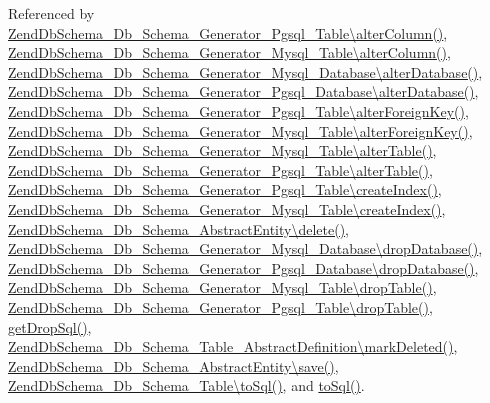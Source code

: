 Referenced by \hyperlink{Generator_2Pgsql_2Table_8php_source_l00174}{Zend\-Db\-Schema\-\_\-\-Db\-\_\-\-Schema\-\_\-\-Generator\-\_\-\-Pgsql\-\_\-\-Table\textbackslash{}alter\-Column()}, \hyperlink{Generator_2Mysql_2Table_8php_source_l00182}{Zend\-Db\-Schema\-\_\-\-Db\-\_\-\-Schema\-\_\-\-Generator\-\_\-\-Mysql\-\_\-\-Table\textbackslash{}alter\-Column()}, \hyperlink{Generator_2Mysql_2Database_8php_source_l00064}{Zend\-Db\-Schema\-\_\-\-Db\-\_\-\-Schema\-\_\-\-Generator\-\_\-\-Mysql\-\_\-\-Database\textbackslash{}alter\-Database()}, \hyperlink{Generator_2Pgsql_2Database_8php_source_l00075}{Zend\-Db\-Schema\-\_\-\-Db\-\_\-\-Schema\-\_\-\-Generator\-\_\-\-Pgsql\-\_\-\-Database\textbackslash{}alter\-Database()}, \hyperlink{Generator_2Pgsql_2Table_8php_source_l00335}{Zend\-Db\-Schema\-\_\-\-Db\-\_\-\-Schema\-\_\-\-Generator\-\_\-\-Pgsql\-\_\-\-Table\textbackslash{}alter\-Foreign\-Key()}, \hyperlink{Generator_2Mysql_2Table_8php_source_l00358}{Zend\-Db\-Schema\-\_\-\-Db\-\_\-\-Schema\-\_\-\-Generator\-\_\-\-Mysql\-\_\-\-Table\textbackslash{}alter\-Foreign\-Key()}, \hyperlink{Generator_2Mysql_2Table_8php_source_l00074}{Zend\-Db\-Schema\-\_\-\-Db\-\_\-\-Schema\-\_\-\-Generator\-\_\-\-Mysql\-\_\-\-Table\textbackslash{}alter\-Table()}, \hyperlink{Generator_2Pgsql_2Table_8php_source_l00083}{Zend\-Db\-Schema\-\_\-\-Db\-\_\-\-Schema\-\_\-\-Generator\-\_\-\-Pgsql\-\_\-\-Table\textbackslash{}alter\-Table()}, \hyperlink{Generator_2Pgsql_2Table_8php_source_l00219}{Zend\-Db\-Schema\-\_\-\-Db\-\_\-\-Schema\-\_\-\-Generator\-\_\-\-Pgsql\-\_\-\-Table\textbackslash{}create\-Index()}, \hyperlink{Generator_2Mysql_2Table_8php_source_l00227}{Zend\-Db\-Schema\-\_\-\-Db\-\_\-\-Schema\-\_\-\-Generator\-\_\-\-Mysql\-\_\-\-Table\textbackslash{}create\-Index()}, \hyperlink{AbstractEntity_8php_source_l00192}{Zend\-Db\-Schema\-\_\-\-Db\-\_\-\-Schema\-\_\-\-Abstract\-Entity\textbackslash{}delete()}, \hyperlink{Generator_2Mysql_2Database_8php_source_l00092}{Zend\-Db\-Schema\-\_\-\-Db\-\_\-\-Schema\-\_\-\-Generator\-\_\-\-Mysql\-\_\-\-Database\textbackslash{}drop\-Database()}, \hyperlink{Generator_2Pgsql_2Database_8php_source_l00110}{Zend\-Db\-Schema\-\_\-\-Db\-\_\-\-Schema\-\_\-\-Generator\-\_\-\-Pgsql\-\_\-\-Database\textbackslash{}drop\-Database()}, \hyperlink{Generator_2Mysql_2Table_8php_source_l00114}{Zend\-Db\-Schema\-\_\-\-Db\-\_\-\-Schema\-\_\-\-Generator\-\_\-\-Mysql\-\_\-\-Table\textbackslash{}drop\-Table()}, \hyperlink{Generator_2Pgsql_2Table_8php_source_l00120}{Zend\-Db\-Schema\-\_\-\-Db\-\_\-\-Schema\-\_\-\-Generator\-\_\-\-Pgsql\-\_\-\-Table\textbackslash{}drop\-Table()}, \hyperlink{AbstractSchema_8php_source_l00327}{get\-Drop\-Sql()}, \hyperlink{AbstractDefinition_8php_source_l00156}{Zend\-Db\-Schema\-\_\-\-Db\-\_\-\-Schema\-\_\-\-Table\-\_\-\-Abstract\-Definition\textbackslash{}mark\-Deleted()}, \hyperlink{AbstractEntity_8php_source_l00169}{Zend\-Db\-Schema\-\_\-\-Db\-\_\-\-Schema\-\_\-\-Abstract\-Entity\textbackslash{}save()}, \hyperlink{Table_8php_source_l00327}{Zend\-Db\-Schema\-\_\-\-Db\-\_\-\-Schema\-\_\-\-Table\textbackslash{}to\-Sql()}, and \hyperlink{AbstractSchema_8php_source_l00341}{to\-Sql()}.



